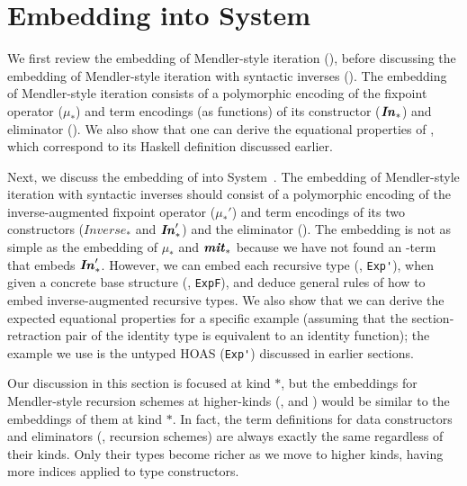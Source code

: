 \section{Embedding \msfit{} into System~\Fw{}}\label{sec:theory}

We first review the embedding of Mendler-style iteration (\MIt{*}),
before discussing the embedding of Mendler-style iteration with
syntactic inverses (\msfit{*}). The embedding of Mendler-style iteration
consists of a polymorphic encoding of the fixpoint operator ($\mu_{*}$)
and term encodings (as functions) of its constructor ($\textbf{\textit{In}}_{*}$)
and eliminator (\MIt{*}). We also show that one can derive
the equational properties of \MIt{*}, which correspond to
its Haskell definition discussed earlier.

Next, we discuss the embedding of \msfit{*}
into System~\Fw. The embedding of Mendler-style iteration with
syntactic inverses should consist of a polymorphic encoding of
the inverse-augmented fixpoint operator ($\mu_{*}'$) and term encodings of
its two constructors ($\textit{Inverse}_{*}$ and $\textbf{\textit{In}}_{*}'$) and the eliminator
(\msfit{*}). The embedding is not as simple as the embedding of $\mu_{*}$
and $\textbf{\textit{mit}}_{*}$ because we have not found an \Fw-term that embeds $\textbf{\textit{In}}_{*}'$.
However, we can embed each recursive type (\eg, \lstinline{Exp'}), when given
a concrete base structure (\eg, \lstinline{ExpF}), and deduce general rules
of how to embed inverse-augmented recursive types. We also show that
we can derive the expected equational properties for a specific example
(assuming that the section-retraction pair of the identity type is
equivalent to an identity function); the example we use is the untyped HOAS
(\lstinline{Exp'}) discussed in earlier sections.

Our discussion in this section is focused at kind $*$, but the embeddings for
Mendler-style recursion schemes at higher-kinds (\eg, \MIt{*\to*} and
\msfit{*\to*}) would be similar to the embeddings of them at kind $*$.
In fact, the term definitions for data constructors and eliminators
(\ie, recursion schemes) are always exactly the same regardless of their kinds.
Only their types become richer as we move to higher kinds, having more indices
applied to type constructors.

